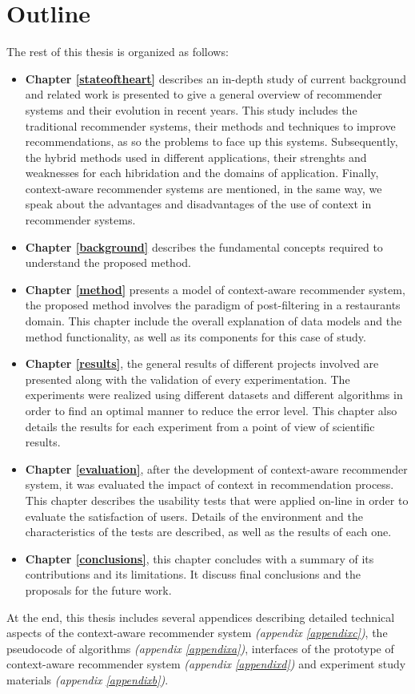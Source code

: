 \section{Outline}

The rest of this thesis is organized as follows: 
\begin{itemize}  
\item \textbf{Chapter \ref{stateoftheart}} describes an in-depth study
of current background and related work is presented to give a general
overview of recommender systems and their evolution in recent years.
This study includes the traditional recommender systems, their methods
and techniques to improve recommendations, as so the problems to face
up this systems. Subsequently, the hybrid methods used in different
applications, their strenghts and weaknesses for each hibridation and
the domains of application. Finally, context-aware recommender systems
are mentioned, in the same way, we speak about the advantages and
disadvantages of the use of context in recommender systems.
\item \textbf{Chapter \ref{background}} describes the fundamental
concepts required to understand the proposed method.
\item \textbf{Chapter \ref{method}} presents a model of context-aware
recommender system, the proposed method  involves the paradigm of
post-filtering in a restaurants domain. This chapter include the
overall explanation of data models and  the method functionality, as
well as its components for this case of study.
\item \textbf{Chapter \ref{results}}, the general results of different
projects involved are presented along with the validation of every
experimentation. The experiments were realized using different
datasets and different algorithms in order to find an optimal manner
to reduce the error level. This chapter also details the results for
each experiment from a point of view of scientific results.
\item \textbf{Chapter \ref{evaluation}}, after the development of
context-aware recommender system, it was evaluated the impact of
context in recommendation process. This chapter describes the
usability tests that were applied on-line in order to evaluate the
satisfaction of users. Details of the environment and the
characteristics of the tests are described, as well as the results of
each one.
\item \textbf{Chapter \ref{conclusions}}, this chapter concludes with a
summary of its contributions and  its limitations. It discuss final
conclusions and the proposals for the future work.
\end{itemize}  
At the end, this thesis includes several appendices describing
detailed technical aspects of the context-aware recommender system
\textit{(appendix \ref{appendixc})}, the pseudocode of algorithms
\textit{(appendix \ref{appendixa})}, interfaces of the prototype of
context-aware recommender system \textit{(appendix \ref{appendixd})}
and experiment study materials \textit{(appendix \ref{appendixb})}.
